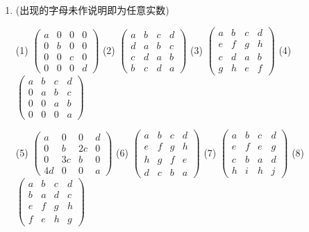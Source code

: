 \documentclass[a4paper,UTF8,fontset=windows]{ctexart}
\begin{document}
\begin{enumerate}
(8) 原矩阵$A=\begin{pmatrix}a_1\\a_2\\a_3\\a_4\end{pmatrix}\begin{pmatrix}b_1&b_2&b_3&b_4\end{pmatrix}$，由$\begin{pmatrix}b_1&b_2&b_3&b_4\end{pmatrix}\begin{pmatrix}a_1\\a_2\\a_3\\a_4\end{pmatrix}=(a_1b_1+a_2b_2+a_3b_3+a_4b_4)$，使用结合律得$A^m=(a_1b_1+a_2b_2+a_3b_3+a_4b_4)^{m-1}A$

\item
(出现的字母未作说明即为任意实数)

(1) $\begin{pmatrix}a&0&0&0\\0&b&0&0\\0&0&c&0\\0&0&0&d\end{pmatrix}$
(2) $\begin{pmatrix}a&b&c&d\\d&a&b&c\\c&d&a&b\\b&c&d&a\end{pmatrix}$
(3) $\begin{pmatrix}a&b&c&d\\e&f&g&h\\c&d&a&b\\g&h&e&f\end{pmatrix}$
(4) $\begin{pmatrix}a&b&c&d\\0&a&b&c\\0&0&a&b\\0&0&0&a\end{pmatrix}$

(5) $\begin{pmatrix}a&0&0&d\\0&b&2c&0\\0&3c&b&0\\4d&0&0&a\end{pmatrix}$
(6) $\begin{pmatrix}a&b&c&d\\e&f&g&h\\h&g&f&e\\d&c&b&a\end{pmatrix}$
(7) $\begin{pmatrix}a&b&c&d\\e&f&e&g\\c&b&a&d\\h&i&h&j\end{pmatrix}$
(8) $\begin{pmatrix}a&b&c&d\\b&a&d&c\\e&f&g&h\\f&e&h&g\end{pmatrix}$


\end{enumerate}
\end{document}
